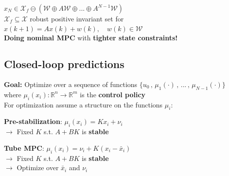 $x_N\in\mathcal{X}_f\ominus(\mathcal{W}\oplus A\mathcal{W}\oplus ... \oplus A^{N-1}\mathcal{W})$\\
$\mathcal{X}_f\subseteq\mathcal{X}$ robust positive invariant set for $x(k+1)=Ax(k)+w(k),\quad w(k)\in\mathcal{W}$\\
\Rightarrow \textbf{Doing nominal MPC} with \textbf{tighter state constraints!}



\subsection{Closed-loop predictions}
\textbf{Goal:} Optimize over a sequence of functions $\{u_0\,,\,\mu_1(\cdot)\,,\,...\,,\,\mu_{N-1}(\cdot)\}$\\
where $\mu_i(x_i):\mathbb{R}^n\rightarrow\mathbb{R}^m$ is the \textbf{control policy}\\
For optimization assume a structure on the functions $\mu_i$:

\noindent
\begin{minipage}{\linewidth}
\begin{minipage}[t]{0.48\linewidth}
\textbf{Pre-stabilization}: $\mu_i(x_i)=Kx_i+\nu_i$\\
$\rightarrow$ Fixed $K$ s.t. $A+BK$ is \textbf{stable}
\end{minipage}%
\hfill
\begin{minipage}[t]{0.48\linewidth}
\textbf{Tube MPC}: $\mu_i(x_i)=\nu_i+K(x_i-\bar{x}_i)$\\
$\rightarrow$ Fixed $K$ s.t. $A+BK$ is \textbf{stable}\\
$\rightarrow$ Optimize over $\bar{x}_i$ and $\nu_i$
\end{minipage}
\end{minipage}

